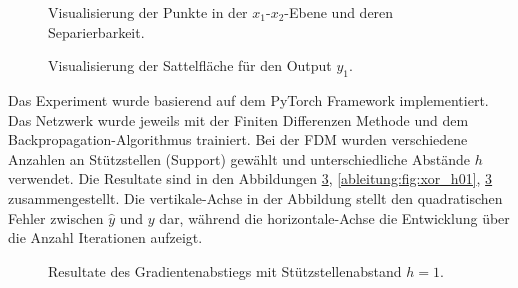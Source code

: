 \begin{figure}
	\centering
		
		\caption{Visualisierung der Punkte in der $x_1$-$x_2$-Ebene und deren
		Separierbarkeit.}
	\label{ableitung:fig:visualisation-surface}
\end{figure}
\begin{figure}
	\centering
	
	\caption{Visualisierung der Sattelfläche für den Output $y_1$.}
	\label{ableitung:fig:visualisation-surface-2}
\end{figure}
Das Experiment wurde basierend auf dem PyTorch Framework implementiert.
%
Das Netzwerk wurde jeweils mit der Finiten Differenzen Methode und dem Backpropagation-Algorithmus trainiert.
Bei der FDM wurden verschiedene Anzahlen an Stützstellen (Support) gewählt und unterschiedliche Abstände $h$ verwendet.
Die Resultate sind in den Abbildungen \ref{ableitung:fig:xor_h1},
\ref{ableitung:fig:xor_h01}, \ref{ableitung:fig:xor_h1} zusammengestellt.
Die vertikale-Achse in der Abbildung stellt den quadratischen Fehler zwischen $\hat{y}$ und $y$ dar, während die horizontale-Achse die Entwicklung über die Anzahl Iterationen aufzeigt.

\begin{figure}
	\caption{Resultate des Gradientenabstiegs mit Stützstellenabstand $h=1$.}
	\label{ableitung:fig:xor_h1}
\end{figure}

